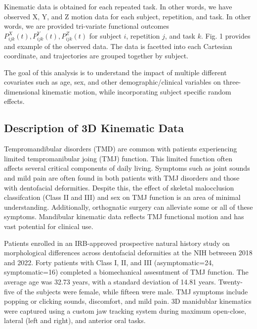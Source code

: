 \documentclass[AMA,Times1COL]{WileyNJDv5} %
\begin{document}
Kinematic data is obtained for each repeated task.  In other words, we have observed X, Y, and Z motion data for each subject, repetition, and task.  In other words, we are provided tri-variate functional outcomes \(P_{ijk}^X(t), P_{ijk}^Y(t), P_{ijk}^Z(t)\) for subject \(i\), repetition \(j\), and task \(k\).  Fig. 1 provides and example of the observed data.  The data is facetted into each Cartesian coordinate, and trajectories are grouped together by subject.  

The goal of this analysis is to understand the impact of multiple different covariates such as age, sex, and other demographic/clinical variables on three-dimensional kinematic motion, while incorporating subject specific random effects. 

\subsection{Description of 3D Kinematic Data}

Tempromandibular disorders (TMD) are common with patients experiencing limited tempromanibular joing (TMJ) function.  This limited function often affects several critical components of daily living.  Symptoms such as joint sounds and mild pain are often found in both patients with TMJ disorders and those with dentofacial deformities.  Despite this, the effect of skeletal malocclusion classifcation (Class II and III) and sex on TMJ function is an area of minimal understanding.  Additionally, orthognatic surgery can alleviate some or all of these symptoms.  Mandibular kinematic data reflects TMJ functional motion and has vast potential for clinical use.  

Patients enrolled in an IRB-approved prospective natural history study on morphological differences across dentofacial deformities at the NIH betweeen 2018 and 2022.  Forty patients with Class I, II, and III (asymptomatic=24, symptomatic=16) completed a biomechanical assesntment of TMJ function.  The average age was 32.73 years, with a standard deviation of 14.81 years.  Twenty-five of the subjects were female, while fifteen were male.  TMJ symptoms include popping or clicking sounds, discomfort, and mild pain.  3D manidublar kinematics were captured using a custom jaw tracking system during maximum open-close, lateral (left and right), and anterior oral tasks.  
\end{document}
